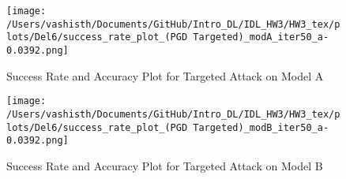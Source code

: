 \begin{solve}
\begin{figure}[H]
\centering
\texttt{[image: /Users/vashisth/Documents/GitHub/Intro\_DL/IDL\_HW3/HW3\_tex/plots/Del6/success\_rate\_plot\_(PGD Targeted)\_modA\_iter50\_a-0.0392.png]}
\caption{Success Rate and Accuracy Plot for Targeted Attack on Model A}
\texttt{[image: /Users/vashisth/Documents/GitHub/Intro\_DL/IDL\_HW3/HW3\_tex/plots/Del6/success\_rate\_plot\_(PGD Targeted)\_modB\_iter50\_a-0.0392.png]}
\caption{Success Rate and Accuracy Plot for Targeted Attack on Model B}
\end{figure}

\end{solve}













